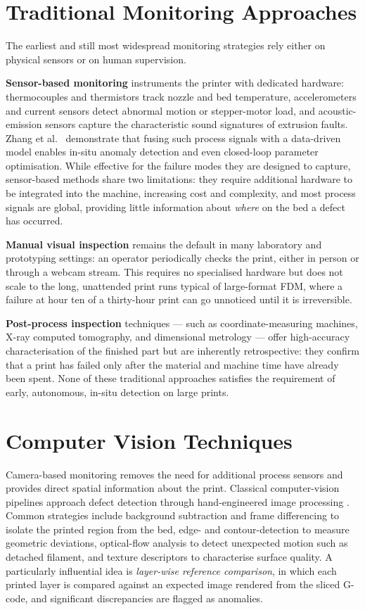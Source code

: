 \documentclass[english, Lau, oneside]{sapthesis}
\begin{document}
\section{Traditional Monitoring Approaches}
The earliest and still most widespread monitoring strategies rely either on physical sensors or on human supervision.

\textbf{Sensor-based monitoring} instruments the printer with dedicated hardware: thermocouples and thermistors track nozzle and bed temperature, accelerometers and current sensors detect abnormal motion or stepper-motor load, and acoustic-emission sensors capture the characteristic sound signatures of extrusion faults. Zhang et al.\ \cite{zhang2025} demonstrate that fusing such process signals with a data-driven model enables in-situ anomaly detection and even closed-loop parameter optimisation. While effective for the failure modes they are designed to capture, sensor-based methods share two limitations: they require additional hardware to be integrated into the machine, increasing cost and complexity, and most process signals are global, providing little information about \textit{where} on the bed a defect has occurred.

\textbf{Manual visual inspection} remains the default in many laboratory and prototyping settings: an operator periodically checks the print, either in person or through a webcam stream. This requires no specialised hardware but does not scale to the long, unattended print runs typical of large-format FDM, where a failure at hour ten of a thirty-hour print can go unnoticed until it is irreversible.

\textbf{Post-process inspection} techniques --- such as coordinate-measuring machines, X-ray computed tomography, and dimensional metrology --- offer high-accuracy characterisation of the finished part but are inherently retrospective: they confirm that a print has failed only after the material and machine time have already been spent. None of these traditional approaches satisfies the requirement of early, autonomous, in-situ detection on large prints.

\section{Computer Vision Techniques}
Camera-based monitoring removes the need for additional process sensors and provides direct spatial information about the print. Classical computer-vision pipelines approach defect detection through hand-engineered image processing \cite{armin2025}. Common strategies include background subtraction and frame differencing to isolate the printed region from the bed, edge- and contour-detection to measure geometric deviations, optical-flow analysis to detect unexpected motion such as detached filament, and texture descriptors to characterise surface quality. A particularly influential idea is \textit{layer-wise reference comparison}, in which each printed layer is compared against an expected image rendered from the sliced G-code, and significant discrepancies are flagged as anomalies.
\end{document}
